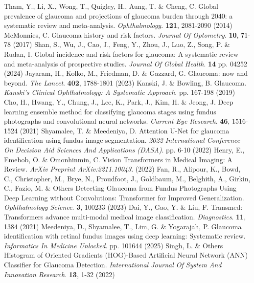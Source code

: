 \documentclass[sn-mathphys]{sn-jnl}%
\theoremstyle{thmstyleone}%
\theoremstyle{thmstyletwo}%
\theoremstyle{thmstylethree}%
\begin{document}
\begin{thebibliography}{}
    Tham, Y., Li, X., Wong, T., Quigley, H., Aung, T. \& Cheng, C. Global prevalence of glaucoma and projections of glaucoma burden through 2040: a systematic review and meta-analysis. {\em Ophthalmology}. \textbf{121}, 2081-2090 (2014)
    McMonnies, C. Glaucoma history and risk factors. {\em Journal Of Optometry}. \textbf{10}, 71-78 (2017)
    Shan, S., Wu, J., Cao, J., Feng, Y., Zhou, J., Luo, Z., Song, P. \& Rudan, I. Global incidence and risk factors for glaucoma: A systematic review and meta-analysis of prospective studies. {\em Journal Of Global Health}. \textbf{14} pp. 04252 (2024)
    Jayaram, H., Kolko, M., Friedman, D. \& Gazzard, G. Glaucoma: now and beyond. {\em The Lancet}. \textbf{402}, 1788-1801 (2023)
    Kanski, J. \& Bowling, B. Glaucoma. {\em Kanski's Clinical Ophthalmology: A Systematic Approach}. pp. 167-198 (2019)
    Cho, H., Hwang, Y., Chung, J., Lee, K., Park, J., Kim, H. \& Jeong, J. Deep learning ensemble method for classifying glaucoma stages using fundus photographs and convolutional neural networks. {\em Current Eye Research}. \textbf{46}, 1516-1524 (2021)
    Shyamalee, T. \& Meedeniya, D. Attention U-Net for glaucoma identification using fundus image segmentation. {\em 2022 International Conference On Decision Aid Sciences And Applications (DASA)}. pp. 6-10 (2022)
    Henry, E., Emebob, O. \& Omonhinmin, C. Vision Transformers in Medical Imaging: A Review. {\em ArXiv Preprint ArXiv:2211.10043}. (2022)
    Fan, R., Alipour, K., Bowd, C., Christopher, M., Brye, N., Proudfoot, J., Goldbaum, M., Belghith, A., Girkin, C., Fazio, M. \& Others Detecting Glaucoma from Fundus Photographs Using Deep Learning without Convolutions: Transformer for Improved Generalization. {\em Ophthalmology Science}. \textbf{3}, 100233 (2023)
    Dai, Y., Gao, Y. \& Liu, F. Transmed: Transformers advance multi-modal medical image classification. {\em Diagnostics}. \textbf{11}, 1384 (2021)
    Meedeniya, D., Shyamalee, T., Lim, G. \& Yogarajah, P. Glaucoma identification with retinal fundus images using deep learning: Systematic review. {\em Informatics In Medicine Unlocked}. pp. 101644 (2025)
    Singh, L. \& Others Histogram of Oriented Gradients (HOG)-Based Artificial Neural Network (ANN) Classifier for Glaucoma Detection. {\em International Journal Of System And Innovation Research}. \textbf{13}, 1-32 (2022)

\end{thebibliography}
\end{document}
